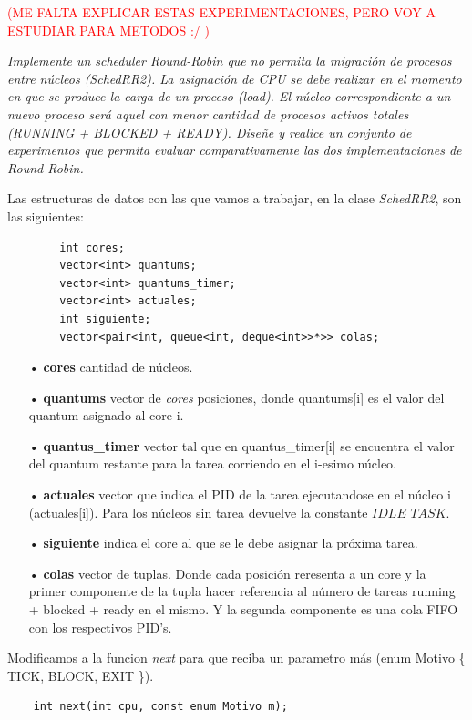 \documentclass[a4paper]{article}
\begin{document}
\textcolor{red}{(ME FALTA EXPLICAR ESTAS EXPERIMENTACIONES, PERO VOY A ESTUDIAR PARA METODOS :/ )} 
 
\textit{Implemente un scheduler Round-Robin que no permita la migraci\'on de procesos entre n\'ucleos (SchedRR2). La asignaci\'on de CPU se debe realizar en el momento en que se produce la carga de un proceso (load). El n\'ucleo correspondiente a un nuevo proceso ser\'a aquel con menor cantidad de procesos activos totales (RUNNING + BLOCKED + READY). Dise\~ne y realice un conjunto de experimentos que permita evaluar comparativamente las dos implementaciones de Round-Robin.}


Las estructuras de datos con las que vamos a trabajar, en la clase \emph{SchedRR2}, son las siguientes:
	\begin{codesnippet}
	\begin{verbatim}
		int cores;
		vector<int> quantums;
		vector<int> quantums_timer;
		vector<int> actuales;
		int siguiente;
		vector<pair<int, queue<int, deque<int>>*>> colas;
	\end{verbatim}
	\end{codesnippet}
	
	\begin{itemize}
	\item[•]\textbf{cores} cantidad de n\'ucleos.
	\item[•]\textbf{quantums} vector de \emph{cores} posiciones, donde quantums[i] es el valor del quantum asignado al core i.
	\item[•]\textbf{quantus_timer}  vector tal que en quantus_timer[i] se encuentra el valor del quantum restante para la tarea corriendo en el i-esimo núcleo.
	\item[•]\textbf{actuales} vector que indica el PID de la tarea ejecutandose en el núcleo i (actuales[i]). Para los núcleos sin tarea devuelve la constante $IDLE\_TASK$.
	\item[•]\textbf{siguiente} indica el core al que se le debe asignar la próxima tarea.
	\item[•]\textbf{colas} vector de tuplas. Donde cada posición reresenta a un core y la primer componente de la tupla hacer referencia al número de tareas running + blocked + ready en el mismo. Y la segunda componente es una cola FIFO con los respectivos PID's.  
	\end{itemize}	
	
\noindent  Modificamos a la funcion \emph{next} para que reciba un parametro m\'as (enum Motivo \{ TICK, BLOCK, EXIT \}).
	\begin{codesnippet}
	\begin{verbatim}
    int next(int cpu, const enum Motivo m);
	\end{verbatim}
	\end{codesnippet}
		
\end{document}
